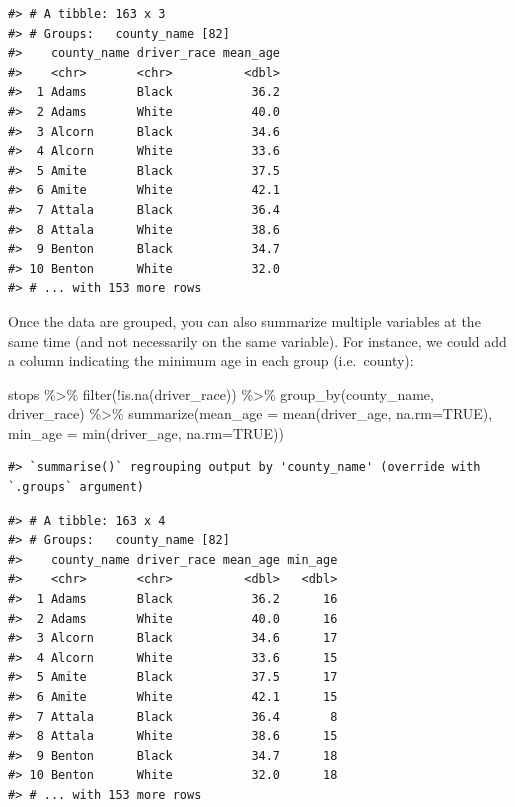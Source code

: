 \documentclass[
]{book}
\newenvironment{Shaded}{\begin{snugshade}}{\end{snugshade}}
\newcommand{\AttributeTok}[1]{\textcolor[rgb]{0.77,0.63,0.00}{#1}}
\newcommand{\ConstantTok}[1]{\textcolor[rgb]{0.00,0.00,0.00}{#1}}
\newcommand{\FunctionTok}[1]{\textcolor[rgb]{0.00,0.00,0.00}{#1}}
\newcommand{\NormalTok}[1]{#1}
\newcommand{\SpecialCharTok}[1]{\textcolor[rgb]{0.00,0.00,0.00}{#1}}
\begin{document}
\begin{verbatim}
#> # A tibble: 163 x 3
#> # Groups:   county_name [82]
#>    county_name driver_race mean_age
#>    <chr>       <chr>          <dbl>
#>  1 Adams       Black           36.2
#>  2 Adams       White           40.0
#>  3 Alcorn      Black           34.6
#>  4 Alcorn      White           33.6
#>  5 Amite       Black           37.5
#>  6 Amite       White           42.1
#>  7 Attala      Black           36.4
#>  8 Attala      White           38.6
#>  9 Benton      Black           34.7
#> 10 Benton      White           32.0
#> # ... with 153 more rows
\end{verbatim}

Once the data are grouped, you can also summarize multiple variables at the same
time (and not necessarily on the same variable). For instance, we could add a
column indicating the minimum age in each group (i.e.~county):

\begin{Shaded}
\begin{Highlighting}[]
\NormalTok{stops }\SpecialCharTok{\%\textgreater{}\%}
  \FunctionTok{filter}\NormalTok{(}\SpecialCharTok{!}\FunctionTok{is.na}\NormalTok{(driver\_race)) }\SpecialCharTok{\%\textgreater{}\%} 
  \FunctionTok{group\_by}\NormalTok{(county\_name, driver\_race) }\SpecialCharTok{\%\textgreater{}\%}
  \FunctionTok{summarize}\NormalTok{(}\AttributeTok{mean\_age =} \FunctionTok{mean}\NormalTok{(driver\_age, }\AttributeTok{na.rm=}\ConstantTok{TRUE}\NormalTok{),}
            \AttributeTok{min\_age =} \FunctionTok{min}\NormalTok{(driver\_age, }\AttributeTok{na.rm=}\ConstantTok{TRUE}\NormalTok{))}
\end{Highlighting}
\end{Shaded}

\begin{verbatim}
#> `summarise()` regrouping output by 'county_name' (override with `.groups` argument)
\end{verbatim}

\begin{verbatim}
#> # A tibble: 163 x 4
#> # Groups:   county_name [82]
#>    county_name driver_race mean_age min_age
#>    <chr>       <chr>          <dbl>   <dbl>
#>  1 Adams       Black           36.2      16
#>  2 Adams       White           40.0      16
#>  3 Alcorn      Black           34.6      17
#>  4 Alcorn      White           33.6      15
#>  5 Amite       Black           37.5      17
#>  6 Amite       White           42.1      15
#>  7 Attala      Black           36.4       8
#>  8 Attala      White           38.6      15
#>  9 Benton      Black           34.7      18
#> 10 Benton      White           32.0      18
#> # ... with 153 more rows
\end{verbatim}
\end{document}
